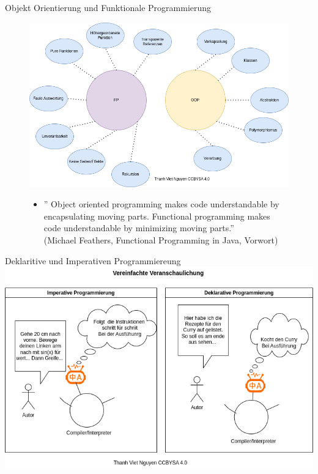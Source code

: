 \documentclass{beamer}
\begin{document}
\begin{frame}{Objekt Orientierung und Funktionale Programmierung}
\begin{figure}
    \centering
    \includegraphics[scale=0.38]{bilder/FPundOOP.drawio.png}
\end{figure}
\end{frame}

\begin{frame}
\begin{figure}
    \begin{itemize}
    \item \textmd{'' Object oriented programming makes code understandable by encapsulating moving parts.
Functional programming makes code understandable by minimizing moving parts.''  \\ 
(Michael Feathers, Functional Programming in Java, Vorwort)}
    \end{itemize}
\end{figure}
\end{frame}

\begin{frame}{Deklaritive und Imperativen Programmiereung}
\centering
\includegraphics[scale=0.38]{bilder/minicom.drawio.png} 
\end{frame}
\end{document}
